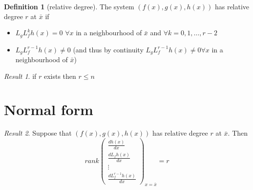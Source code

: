 \documentclass{book}
\theoremstyle{definition}
\newtheorem{definition}{Definition}[section]
\theoremstyle{remark}
\theoremstyle{remark}
\newtheorem*{result}{Result}
\begin{document}
\begin{definition}[relative degree]
    The system $(f(x),g(x),h(x))$ has relative degree $r$ at $\bar{x}$ if
    \begin{itemize}
        \item $L_gL_f^kh(x)=0$ $\forall x$ in a  neighbourhood of $\bar{x}$ and $\forall k = 0,1,\dots,r-2$
        \item $L_gL_f^{r-1}h(x)\neq 0$ (and thus by continuity $L_gL_f^{r-1}h(x)\neq 0 \forall x$ in a neighbourhood of $\bar{x}$)
    \end{itemize}
\end{definition}

\begin{result}
    if $r$ exists then $r\leq n$
\end{result}
\section{Normal form}
\begin{result}
    Suppose that $(f(x),g(x),h(x))$ has relative degree $r$ at $\bar{x}$. Then
    \[
        rank \begin{pmatrix}
            \frac{dh(x)}{dx}\\\frac{dL_fh(x)}{dx}\\\vdots\\\frac{dL_f^{r-1}h(x)}{dx}
        \end{pmatrix}_{x=\bar{x}} = r
    \]
\end{result}
\end{document}
